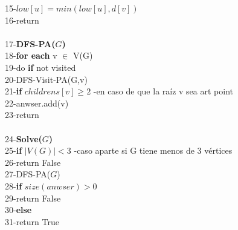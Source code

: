 \documentclass{article}
\begin{document}
\begin{algorithm}[H]
        15-\hspace*{4em}$low[u]=min(low[u],d[v])$\\ 
        16-\hspace*{2em}return\\\\
        17-\hspace*{1em}\noindent \textbf{DFS-PA($G$)}\\
        18-\hspace*{2em}\noindent \textbf{for each} v $\in$ V(G)\\
        19-\hspace*{3em}do \noindent \textbf{if} not visited\\
        20-\hspace*{4em}DFS-Visit-PA(G,v)\\
        21-\hspace*{4em}\noindent \textbf{if} $childrens[v] \ge 2$ -en caso de que la ra\'iz v  sea art point \\
        22-\hspace*{5em}anwser.add(v)\\
        23-\hspace*{2em}return \\\\
        24-\hspace*{1em}\noindent \textbf{Solve($G$)}\\
        25-\hspace*{2em}\noindent \textbf{if} $|V(G)| < 3$ -caso aparte si G tiene menos de 3 v\'ertices\\ 
        26-\hspace*{3em}return False\\
        27-\hspace*{2em}DFS-PA($G$)\\
        28-\hspace*{2em}\noindent \textbf{if} $size(anwser) > 0$\\
        29-\hspace*{3em}return False\\
        30-\hspace*{2em}\noindent \textbf{else}\\
        31-\hspace*{3em}return True\\
                
    \end{algorithm}
\end{document}
